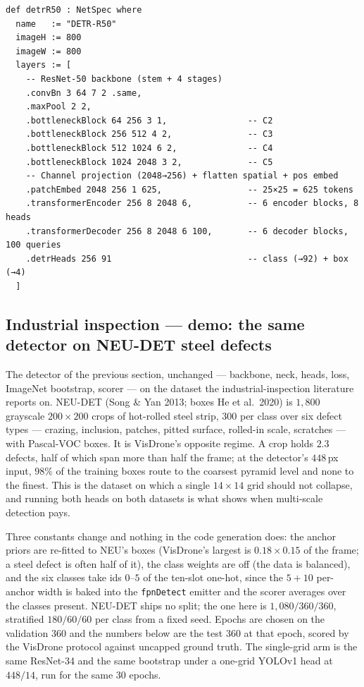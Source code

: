 \begin{verbatim}
def detrR50 : NetSpec where
  name   := "DETR-R50"
  imageH := 800
  imageW := 800
  layers := [
    -- ResNet-50 backbone (stem + 4 stages)
    .convBn 3 64 7 2 .same,
    .maxPool 2 2,
    .bottleneckBlock 64 256 3 1,                -- C2
    .bottleneckBlock 256 512 4 2,               -- C3
    .bottleneckBlock 512 1024 6 2,              -- C4
    .bottleneckBlock 1024 2048 3 2,             -- C5
    -- Channel projection (2048→256) + flatten spatial + pos embed
    .patchEmbed 2048 256 1 625,                 -- 25×25 = 625 tokens
    .transformerEncoder 256 8 2048 6,           -- 6 encoder blocks, 8 heads
    .transformerDecoder 256 8 2048 6 100,       -- 6 decoder blocks, 100 queries
    .detrHeads 256 91                           -- class (→92) + box (→4)
  ]
\end{verbatim}

\subsection{Industrial inspection --- demo: the same detector on NEU-DET steel defects}
\label{sec:bestiary_inspection}

The detector of the previous section, unchanged --- backbone, neck, heads,
loss, ImageNet bootstrap, scorer --- on the dataset the industrial-inspection
literature reports on. NEU-DET (Song \& Yan 2013; boxes He et al.\ 2020) is
$1{,}800$ grayscale $200\times200$ crops of hot-rolled steel strip, $300$ per
class over six defect types --- crazing, inclusion, patches, pitted surface,
rolled-in scale, scratches --- with Pascal-VOC boxes. It is VisDrone's opposite
regime. A crop holds $2.3$ defects, half of which span more than half the frame;
at the detector's $448$\,px input, $98\%$ of the training boxes route to the
coarsest pyramid level and none to the finest. This is the dataset on which a
single $14\times14$ grid should not collapse, and running both heads on
both datasets is what shows when multi-scale detection pays.

Three constants change and nothing in the code generation does: the anchor
priors are re-fitted to NEU's boxes (VisDrone's largest is $0.18\times0.15$ of
the frame; a steel defect is often half of it), the class weights are off
(the data is balanced), and the six classes take ids $0$--$5$ of the ten-slot
one-hot, since the $5+10$ per-anchor width is baked into the \texttt{fpnDetect}
emitter and the scorer averages over the classes present. NEU-DET ships no
split; the one here is $1{,}080/360/360$, stratified $180/60/60$ per class from
a fixed seed. Epochs are chosen on the validation $360$ and the numbers below
are the test $360$ at that epoch, scored by the VisDrone protocol against
uncapped ground truth. The single-grid arm is the same ResNet-34 and the same
bootstrap under a one-grid YOLOv1 head at $448/14$, run for the same 30
epochs.

